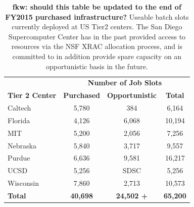 \documentclass[11pt,a4paper]{article}
\begin{document}
\begin{table}
\begin{center}
\begin{tabular}{|l|c|c|c|}
\hline
& \multicolumn{3}{|c|}{\bf Number of Job Slots} \\ \cline{2-4}
{\bf Tier 2 Center}                         & {\bf Purchased} & {\bf Opportunistic} & {\bf Total} \\ \hline
Caltech                                         & 5,780 &    384 &   6,164 \\
Florida                                          & 4,126 & 6,068 & 10,194 \\
MIT                                               & 5,200 & 2,056 &   7,256 \\
Nebraska                                      & 5,840 & 3,717 &   9,557 \\
Purdue                                          & 6,636 & 9,581 & 16,217 \\
UCSD                                           & 5,256 & SDSC &  5,256 \\ 
Wisconsin                                     & 7,860 & 2,713  & 10,573 \\ \hline
{\bf Total}                                       & {\bf 40,698} & {\bf 24,502 +} & {\bf 65,200} \\ \hline
\end{tabular}
\caption[]
{
{\bf fkw: should this table be updated to the end of FY2015 purchased infrastructure?}
Useable batch slots currently deployed at US Tier2 centers.
The San Diego Supercomputer Center has in the past provided access
to resources via the NSF XRAC allocation process, and is committed to in addition 
provide spare capacity on an opportunistic basis in the future.
}
\label{compute-resources}
\end{center}
\end{table}
\end{document}
